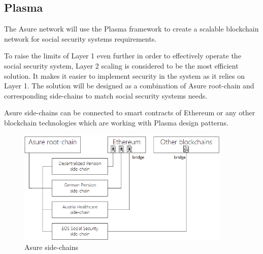 \subsection{Plasma}
The Asure network will use the Plasma framework to create a scalable blockchain network for social security systems requirements. 

To raise the limits of Layer 1 even further in order to effectively operate the social security system, Layer 2 scaling is considered to be the most efficient solution. It makes it easier to implement security in the system as it relies on Layer 1. The solution will be designed as a combination of Asure root-chain and corresponding side-chains to match social security systems needs.

Asure side-chains can be connected to smart contracts of Ethereum or any other blockchain technologies which are working with Plasma design patterns.


\begin{figure}[H]
    \centering
    \includegraphics[width=4.0in]{img/chains.png}
    \caption{Asure side-chains}
    \label{fig:asure_side_chains}
\end{figure}
